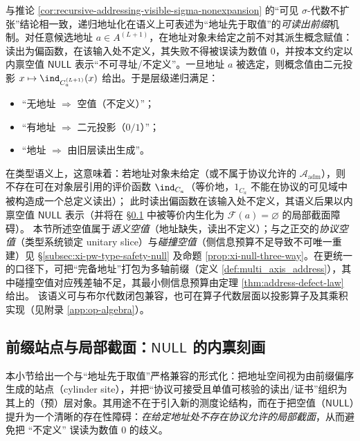 与推论 \ref{cor:recursive-addressing-visible-sigma-nonexpansion} 的“可见 \texorpdfstring{$\sigma$}{sigma}-代数不扩张”结论相一致，递归地址化在语义上可表述为“地址先于取值”的\emph{可读出前缀}机制。对任意候选地址 \(a\in A^{(L+1)}\)，在地址对象未给定之前不对其派生概念赋值：读出为偏函数，在该输入处不定义，其失败不得被误读为数值 \(0\)，并按本文约定以内禀空值 \(\mathsf{NULL}\) 表示“不可寻址/不定义”。一旦地址 \(a\) 被选定，则概念值由二元投影 \(x\mapsto \ind_{C_a^{(L+1)}}(x)\) 给出。于是层级递归满足：
\begin{itemize}
  \item “无地址 $\Rightarrow$ 空值（不定义）”；
  \item “有地址 $\Rightarrow$ 二元投影（$0/1$）”；
  \item “地址 $\Rightarrow$ 由旧层读出生成”。
\end{itemize}
在类型语义上，这意味着：若地址对象未给定（或不属于协议允许的 \(\mathcal{A}_{\mathrm{adm}}\)），则不存在可在对象层引用的评价函数 \(\ind_{C_a}\)（等价地，\(1_{C_a}\) 不能在协议的可见域中被构造成一个总定义读出）；
此时读出偏函数在该输入处不定义，其语义后果以内禀空值 \(\mathsf{NULL}\) 表示（并将在 \S\ref{subsec:prefix-site-null} 中被等价内生化为 \(\mathscr{F}(a)=\varnothing\) 的局部截面障碍）。
本节所述空值属于\emph{语义空值}（地址缺失，读出不定义）；与之正交的\emph{协议空值}（类型系统锁定 unitary slice）与\emph{碰撞空值}（侧信息预算不足导致不可唯一重建）见 \S\ref{subsec:xi-pw-type-safety-null} 及命题 \ref{prop:xi-null-three-way}。在更统一的口径下，可把“完备地址”打包为多轴前缀（定义 \ref{def:multi_axis_address}），其中碰撞空值对应残差轴不足，其最小侧信息预算由定理 \ref{thm:address-defect-law} 给出。
该语义可与布尔代数闭包兼容，也可在算子代数层面以投影算子及其乘积实现（见附录 \ref{app:op-algebra}）。

\subsection{前缀站点与局部截面：\texorpdfstring{$\mathsf{NULL}$}{NULL} 的内禀刻画}\label{subsec:prefix-site-null}
本小节给出一个与“地址先于取值”严格兼容的形式化：把地址空间视为由前缀偏序生成的站点（cylinder site），并把“协议可接受且单值可核验的读出/证书”组织为其上的（预）层对象。其用途不在于引入新的测度论结构，而在于把空值（\(\mathsf{NULL}\)）提升为一个清晰的存在性障碍：\emph{在给定地址处不存在协议允许的局部截面}，从而避免把 “不定义” 误读为数值 \(0\) 的歧义。

